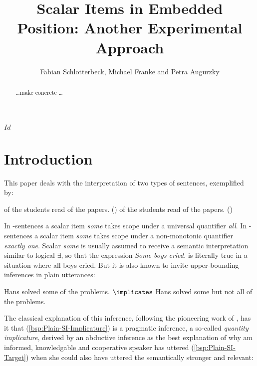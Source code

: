 \documentclass[fleqn,reqno,10pt]{article}
\title{Scalar Items in Embedded Position: {A}nother Experimental Approach}
\author{Fabian Schlotterbeck, Michael Franke and Petra Augurzky}
\date{}
\newcommand{\as}{\acro{as}}
\renewcommand{\es}{\acro{es}}
\renewcommand{\AE}{\as}
\newcommand{\GE}{\es}
\newcommand{\mymark}[1]{{\color{mycol}{#1}}}
\begin{document}
\maketitle


\begin{abstract}
  \dots make concrete \dots
\end{abstract}

\svnInfo $Id$

\section{Introduction}
\label{sec:introduction}

This paper deals with the interpretation of two types of
sentences, exemplified by:

\begin{exe}
\ex \label{bsp:AE}
  \mymark{All} of the students read \mymark{some} of the
  papers. \hfill (\AE)
\ex \label{bsp:GE} 
  \mymark{Exactly one} of the students read \mymark{some} of the
  papers. \hfill (\GE)
\end{exe}

\noindent In \as-sentences a scalar item \emph{some} takes scope under
a universal quantifier \emph{all}. In \es-sentences a scalar item
\emph{some} takes scope under a non-monotonic quantifier \emph{exactly
  one}. Scalar \emph{some} is usually assumed to receive a semantic
interpretation similar to logical $\exists$, so that the expression
\emph{Some boys cried.} is literally true in a situation where all
boys cried. But it is also known to invite upper-bounding inferences
in plain utterances:

\begin{exe}
  \ex \label{bsp:Plain-SI}
    \begin{xlist}
      \ex \label{bsp:Plain-SI-Target} Hans solved some of the problems.
      \ex \label{bsp:Plain-SI-Implicature} $\implicates$ Hans solved some but not all of the problems.
    \end{xlist}
\end{exe}

\noindent The classical explanation of this inference, following the
pioneering work of \citet{Grice1975:Logic-and-Conve}, has it that
(\ref{bsp:Plain-SI-Implicature}) is a pragmatic inference, a so-called
\emph{quantity implicature}, derived by an abductive inference as the
best explanation of why am informed, knowledgable and cooperative
speaker has uttered (\ref{bsp:Plain-SI-Target}) when she could also
have uttered the semantically stronger and relevant:
\end{document}
